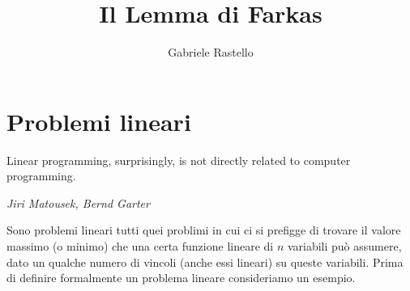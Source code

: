 \documentclass[italian, letter paper, 12pt, reqno]{article}
\theoremstyle{myteo}
\numberwithin{equation}{section}
\begin{document}
\title{Il Lemma di Farkas}
\author{Gabriele Rastello}
\maketitle

\section{Problemi lineari}
\epigraph{Linear programming, surprisingly, is not directly related to computer programming.}{\textit{Jiri Matousek, Bernd Garter}}
Sono problemi lineari tutti quei problimi in cui ci si prefigge di trovare il valore massimo (o minimo) che una certa funzione lineare di \(n\) variabili può assumere, dato un qualche numero di vincoli (anche essi lineari) su queste variabili.
Prima di definire formalmente un problema lineare consideriamo un esempio.
\end{document}
